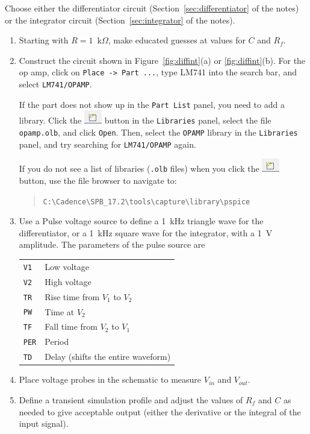 \documentclass[11pt]{article}
\begin{document}
Choose either the differentiator circuit
(Section~\ref{sec:differentiator} of the notes) or the integrator
circuit (Section~\ref{sec:integrator} of the notes).

\begin{enumerate}
\item Starting with $R = 1$~k$\Omega$, make educated guesses at values
  for $C$ and $R_f$. 
  
\item Construct the circuit shown in Figure~\ref{fig:diffint}(a)
  or \ref{fig:diffint}(b). For the op amp, click on
  \texttt{Place -> Part ...}, type LM741 into the search bar, and
  select \texttt{LM741/OPAMP}.

  If the part does not show up in the \texttt{Part List} panel, you
  need to add a library. Click the \includegraphics{OrCAD_AddLib.png}
  button in the \texttt{Libraries} panel, select the file
  \texttt{opamp.olb}, and click \texttt{Open}. Then, select the
  \texttt{OPAMP} library in the \texttt{Libraries} panel, and try
  searching for \texttt{LM741/OPAMP} again.
  
  If you do not see a list of libraries (\texttt{.olb} files) when you
  click the \includegraphics{OrCAD_AddLib.png} button, use the file
  browser to navigate to:
  \begin{quote}
    \verb+C:\Cadence\SPB_17.2\tools\capture\library\pspice+
  \end{quote}

\item Use a Pulse voltage source to define a 1~kHz triangle wave for
  the differentiator, or a 1~kHz square wave for the integrator, with
  a 1~V amplitude. The parameters of the pulse source are
    \begin{center}
      \begin{tabular}{ll}
        \texttt{V1}  & Low voltage \\
        \texttt{V2}  & High voltage \\
        \texttt{TR}  & Rise time from $V_1$ to $V_2$ \\
        \texttt{PW}  & Time at $V_2$ \\
        \texttt{TF}  & Fall time from $V_2$ to $V_1$ \\
        \texttt{PER} & Period \\
        \texttt{TD}  & Delay (shifts the entire waveform)
      \end{tabular}
    \end{center}

\item Place voltage probes in the schematic to measure $V_{in}$ and
  $V_{out}$.
  
\item Define a transient simulation profile and adjust the values of
  $R_f$ and $C$ as needed to give acceptable output (either the
  derivative or the integral of the input signal).

\end{enumerate}
\end{document}
